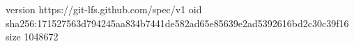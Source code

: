 version https://git-lfs.github.com/spec/v1
oid sha256:171527563d794245aa834b7441de582ad65e85639e2ad5392616bd2c30c39f16
size 1048672
